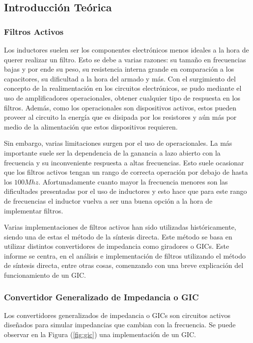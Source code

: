 
\subsection{Introducción Teórica}

\subsubsection{Filtros Activos}

Los inductores suelen ser los componentes electrónicos menos ideales a la hora de querer realizar un filtro. Esto se debe a varias razones: su tamaño en frecuencias bajas y por ende su peso, su resistencia interna grande en comparación a los capacitores, su dificultad a la hora del armado y más. Con el surgimiento del concepto de la realimentación en los circuitos electrónicos, se pudo mediante el uso de amplificadores operacionales, obtener cualquier tipo de respuesta en los filtros. Además, como los operacionales son dispositivos activos, estos pueden proveer al circuito la energía que es disipada por los resistores y aún más por medio de la alimentación que estos dispositivos requieren.

Sin embargo, varias limitaciones surgen por el uso de operacionales. La más importante suele ser la dependencia de la ganancia a lazo abierto con la frecuencia y su inconveniente respuesta a altas frecuencias. Esto suele ocasionar que los filtros activos tengan un rango de correcta operación por debajo de hasta los $100Mhz$. Afortunadamente cuanto mayor la frecuencia menores son las dificultades presentadas por el uso de inductores y esto hace que para este rango de frecuencias el inductor vuelva a ser una buena opción a la hora de implementar filtros.

Varias implementaciones de filtros activos han sido utilizadas históricamente, siendo una de estas el método de la síntesis directa. Este método se basa en utilizar distintos convertidores de impedancia como giradores o GICs. Este informe se centra, en el análisis e implementación de filtros utilizando el método de síntesis directa, entre otras cosas, comenzando con una breve explicación del funcionamiento de un GIC.

\subsubsection{Convertidor Generalizado de Impedancia o GIC}
Los convertidores generalizados de impedancia o GICs son circuitos activos diseñados para simular impedancias que cambian con la frecuencia. Se puede observar en la Figura (\ref{fig:gic}) una implementación de un GIC.


